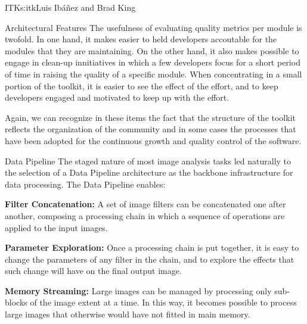 \begin{aosachapter}{ITK}{s:itk}{Luis Ib\'{a}\~{n}ez and Brad King}
\begin{aosasect1}{Architectural Features}
The usefulness of evaluating quality metrics per module is twofold. In one
hand, it makes easier to held developers accoutable for the modules that they
are maintaining. On the other hand, it also makes possible to engage in
clean-up innitiatives in which a few developers focus for a short period of
time in raising the quality of a specific module. When concentrating in a small
portion of the toolkit, it is easier to see the effect of the effort, and to
keep developers engaged and motivated to keep up with the effort.

Again, we can recognize in these items the fact that the structure of the
toolkit reflects the organization of the community and in some cases the
processes that have been adopted for the continuous growth and quality control
of the software.

\begin{aosasect2}{Data Pipeline}
The staged nature of most image analysis tasks led naturally to the selection
of a Data Pipeline architecture as the backbone infrastructure for data
processing. The Data Pipeline enables:

\begin{aosaitemize}

\item \textbf{Filter Concatenation:} A set of image filters can be concatenated
one after another, composing a processing chain in which a sequence of
operations are applied to the input images.

\item \textbf{Parameter Exploration:} Once a processing chain is put together,
it is easy to change the parameters of any filter in the chain, and to explore
the effects that such change will have on the final output image.

\item \textbf{Memory Streaming:} Large images can be managed by processing only
sub-blocks of the image extent at a time. In this way, it becomes possible to
process large images that otherwise would have not fitted in main memory.

\end{aosaitemize}



\end{aosasect2}
\end{aosasect1}
\end{aosachapter}
